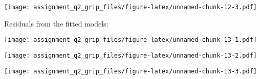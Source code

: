 \begin{Shaded}
\begin{Highlighting}[]
\NormalTok{(}\NormalTok{, }\NormalTok{(}\NormalTok{), }\NormalTok{(}\NormalTok{), }\SpecialCharTok{:}\NormalTok{, }\NormalTok{)}
\end{Highlighting}
\end{Shaded}

\texttt{[image: assignment\_q2\_grip\_files/figure-latex/unnamed-chunk-12-3.pdf]}

Residuals from the fitted models:

\begin{Shaded}
\begin{Highlighting}[]
\NormalTok{(}\NormalTok{)}
\end{Highlighting}
\end{Shaded}

\texttt{[image: assignment\_q2\_grip\_files/figure-latex/unnamed-chunk-13-1.pdf]}

\begin{Shaded}
\begin{Highlighting}[]
\NormalTok{(}\NormalTok{)}
\end{Highlighting}
\end{Shaded}

\texttt{[image: assignment\_q2\_grip\_files/figure-latex/unnamed-chunk-13-2.pdf]}

\begin{Shaded}
\begin{Highlighting}[]
\NormalTok{)}
\end{Highlighting}
\end{Shaded}

\texttt{[image: assignment\_q2\_grip\_files/figure-latex/unnamed-chunk-13-3.pdf]}

\begin{Shaded}
\begin{Highlighting}[]
\NormalTok{)}
\end{Highlighting}
\end{Shaded}

